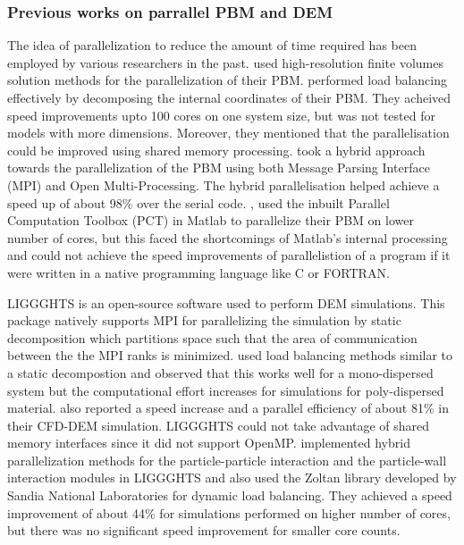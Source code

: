 \documentclass[preprint,11pt,authoryear]{elsarticle}
\begin{document}
\subsubsection{Previous works on parrallel PBM and DEM}
\par  The idea of parallelization to reduce the amount of time required has been employed by various researchers in the past. \cite{Gunawan2008} used high-resolution finite volumes solution methods for the parallelization of their PBM. \cite{Gunawan2008} performed load balancing effectively by decomposing the internal coordinates of their PBM. They acheived speed improvements upto 100 cores on one system size, but was not tested for models with more dimensions. Moreover, they mentioned that the parallelisation could be improved using shared memory processing. \cite{Bettencourt2017} took a hybrid approach towards the parallelization of the PBM using both Message Parsing Interface (MPI) and Open Multi-Processing. The hybrid parallelisation helped achieve a speed up of about 98\% over the serial code. \cite{Prakash2013a},\cite{Prakash2013b} used the inbuilt Parallel Computation Toolbox (PCT) in Matlab to parallelize their PBM on lower number of cores, but this faced the shortcomings of Matlab's internal processing and could not achieve the speed improvements of parallelistion of a program if it were written in a native programming language like C or FORTRAN. 
\par  LIGGGHTS is an open-source software used to perform DEM simulations. This package natively supports MPI for parallelizing the simulation by static decomposition which partitions space such that the area of communication between the the MPI ranks is minimized. \cite{kacianauskas2010} used load balancing methods similar to a static decompostion and observed that this works well for a mono-dispersed system but the computational effort increases for simulations for poly-dispersed material. \cite{Gopalakrishnan2013} also reported a speed increase and a parallel efficiency of about 81\% in their CFD-DEM simulation. LIGGGHTS could not take advantage of shared memory interfaces since it did not support OpenMP. \cite{Berger2015} implemented hybrid parallelization methods for the particle-particle interaction and the particle-wall interaction modules in LIGGGHTS and also used the Zoltan library \citep{Boman2012} developed by Sandia National Laboratories for dynamic load balancing. They achieved a speed improvement of about 44\% for simulations performed on higher number of cores, but there was no significant speed improvement for smaller core counts. 
\end{document}
